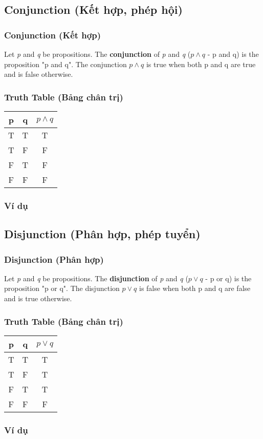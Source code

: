 \documentclass{beamer}
\begin{document}
\subsection{Conjunction (Kết hợp, phép hội)}
\begin{frame}
    \frametitle{Conjunction (Kết hợp)}
    Let \textit{p} and \textit{q} be propositions. The \textbf{conjunction} of \textit{p} and \textit{q} ($p \wedge q$ - p and q) is the proposition "p and q". The conjunction $p \wedge q$ is true when both p and q are true and is false otherwise.
    \end{frame}
\begin{frame}
    \frametitle{Truth Table (Bảng chân trị)}
    \begin{center}
        \begin{tabular}{|c|c|c|}
            \hline
            p & q & $p \wedge q$\\
            \hline
            T & T & T \\
            \hline
            T & F & F \\
            \hline
            F & T & F \\
            \hline
            F & F & F \\
            \hline
        \end{tabular}
        \end{center}
\end{frame}
\begin{frame}
    \frametitle{Ví dụ}

    \end{frame}
\subsection{Disjunction (Phân hợp, phép tuyển)}
\begin{frame}
    \frametitle{Disjunction (Phân hợp)}
    Let \textit{p} and \textit{q} be propositions. The \textbf{disjunction} of \textit{p} and \textit{q} ($p \vee q$ - p or q) is the proposition "p or q". The disjunction $p \vee q$ is false when both p and q are false and is true otherwise.
\end{frame}
\begin{frame}
    \frametitle{Truth Table (Bảng chân trị)}
    \begin{center}
        \begin{tabular}{|c|c|c|}
            \hline
            p & q & $p \vee q$\\
            \hline
            T & T & T \\
            \hline
            T & F & T \\
            \hline
            F & T & T \\
            \hline
            F & F & F \\
            \hline
        \end{tabular}
        \end{center}
        \end{frame}
\begin{frame}
    \frametitle{Ví dụ}
\end{frame}
\end{document}
